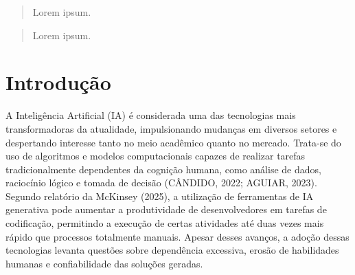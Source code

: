 \documentclass[english,brazilian]{UNISINOSartigo} %
\begin{document}
\capa
\folhaderosto


%
\begin{abstract}
Lorem ipsum.

\end{abstract}

\begin{otherlanguage}{english}
\singlespacing
\begin{abstract}
Lorem ipsum.
\end{abstract}
\end{otherlanguage}

\section{Introdução}

A Inteligência Artificial (IA) é considerada uma das tecnologias mais transformadoras da atualidade, impulsionando mudanças em diversos setores e despertando interesse tanto no meio acadêmico quanto no mercado. Trata-se do uso de algoritmos e modelos computacionais capazes de realizar tarefas tradicionalmente dependentes da cognição humana, como análise de dados, raciocínio lógico e tomada de decisão (CÂNDIDO, 2022; AGUIAR, 2023). Segundo relatório da McKinsey (2025), a utilização de ferramentas de IA generativa pode aumentar a produtividade de desenvolvedores em tarefas de codificação, permitindo a execução de certas atividades até duas vezes mais rápido que processos totalmente manuais. Apesar desses avanços, a adoção dessas tecnologias levanta questões sobre dependência excessiva, erosão de habilidades humanas e confiabilidade das soluções geradas.
\end{document}
